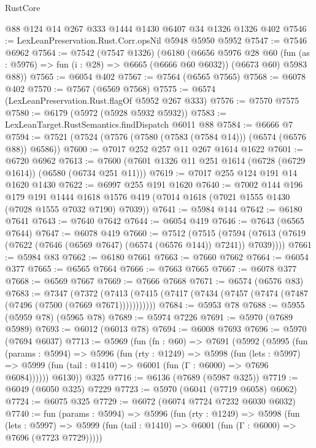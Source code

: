 \begin{lexlean}{RustCore}
\begin{coremodule}
{\begin{coremodule}
{{{{{{{{{{{{{{{{{{{{{{{{{{{{{{{{{{{{{{{{{{{{{    @88
    @124
    @14
    @267
    @333
    @1444
    @1430
    @6407
    @34
    @1326
    @1326
    @402
@7546 := LexLeanPreservation.Rust.Corr.opsNil @5948 @5950 @5952
@7547 := @7546 @6962
@7564 := @7542
    (@7547 @1326)
    (@6180
      (@6656
        @5976
        @28
        @60
        (fun (as : @5976) => fun (i : @28) => @6665 (@6666 @60 @6032))
        (@6673 @60)
        @5983
        @88))
@7565 := @6054 @402
@7567 := @7564 (@6565 @7565)
@7568 := @6078 @402
@7570 := @7567 (@6569 @7568)
@7575 := @6574 (LexLeanPreservation.Rust.flagOf @5952 @267 @333)
@7576 := @7570 @7575
@7580 := @6179 (@5972 (@5928 @5932 @5932))
@7583 := LexLeanTarget.RustSemantics.findDispatch @6011 @88
@7584 := @6666 @7
@7594 := @7521 (@7524 (@7576 (@7580 (@7583 (@7584 @14))) (@6574 (@6576 @88)) @6586))
@7600 := @7017 @252 @257 @11 @267 @1614 @1622
@7601 := @6720 @6962
@7613 := @7600 (@7601 @1326 @11 @251 @1614 (@6728 (@6729 @1614)) (@6580 (@6734 @251 @11)))
@7619 := @7017 @255 @124 @191 @14 @1620 @1430
@7622 := @6997 @255 @191 @1620
@7640 := @7002
    @144
    @196
    @179
    @191
    @1444
    @1618
    @1576
    @419
    (@7014 @1618 (@7021 @1555 @1430 (@7028 @1555 @7032 @7190) @7039))
@7641 := @5984 @144
@7642 := @6180 @7641
@7643 := @7640 @7642
@7644 := @6054 @419
@7646 := @7643 (@6565 @7644)
@7647 := @6078 @419
@7660 := @7512
    (@7515 (@7594 (@7613 (@7619 (@7622 (@7646 (@6569 @7647) (@6574 (@6576 @144)) @7241)) @7039))))
@7661 := @5984 @83
@7662 := @6180 @7661
@7663 := @7660 @7662
@7664 := @6054 @377
@7665 := @6565 @7664
@7666 := @7663 @7665
@7667 := @6078 @377
@7668 := @6569 @7667
@7669 := @7666 @7668
@7671 := @6574 (@6576 @83)
@7683 := @7347
    (@7372 (@7413 (@7415 (@7417 (@7434 (@7457 (@7474 (@7487 (@7496 (@7500 (@7669 @7671)))))))))))
@7684 := @5953 @78
@7688 := @5955 (@5959 @78) (@5965 @78)
@7689 := @5974 @7226
@7691 := @5970 (@7689 @5989)
@7693 := @6012 (@6013 @78)
@7694 := @6008 @7693
@7696 := @5970 (@7694 @6037)
@7713 := @5969
    (fun (fn : @60) =>
    @7691
      (@5992
        (@5995
          (fun (params : @5994) =>
          @5996
            (fun (rty : @1249) =>
            @5998
              (fun (lets : @5997) =>
              @5999 (fun (tail : @1410) => @6001 (fun (Γ : @6000) => @7696 @6084))))))
        @6130))
    @325
@7716 := @6136 (@7689 (@5987 @325))
@7719 := @6049 (@6050 @325) @7229
@7723 := @5970 (@6041 (@7719 @6058) @6062)
@7724 := @6075 @325
@7729 := @6072 (@6074 @7724 @7232 @6030 @6032)
@7740 := fun (params : @5994) =>
  @5996
    (fun (rty : @1249) =>
    @5998
      (fun (lets : @5997) =>
      @5999 (fun (tail : @1410) => @6001 (fun (Γ : @6000) => @7696 (@7723 @7729)))))
}}}}}}}}}}}}}}}}}}}}}}}}}}}}}}}}}}}}}}}}}}}}}
\end{coremodule}}
\end{coremodule}
\end{lexlean}
